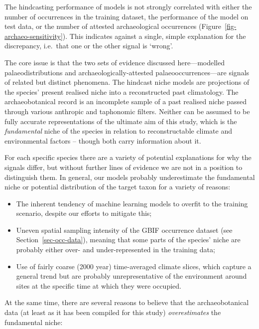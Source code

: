 \documentclass[
  authoryear,
  preprint]{elsarticle}
\providecommand{\tightlist}{%
  \setlength{\itemsep}{0pt}\setlength{\parskip}{0pt}}
\begin{document}
The hindcasting performance of models is not strongly correlated with
either the number of occurrences in the training dataset, the
performance of the model on test data, or the number of attested
archaeological occurrences (Figure~\ref{fig-archaeo-sensitivity}). This
indicates against a single, simple explanation for the discrepancy,
i.e.~that one or the other signal is `wrong'.

The core issue is that the two sets of evidence discussed
here---modelled palaeodistributions and archaeologically-attested
palaeooccurrences---are signals of related but distinct phenomena. The
hindcast niche models are projections of the species' present realised
niche into a reconstructed past climatology. The archaeobotanical record
is an incomplete sample of a past realised niche passed through various
anthropic and taphonomic filters. Neither can be assumed to be fully
accurate representations of the ultimate aim of this study, which is the
\emph{fundamental} niche of the species in relation to reconstructable
climate and environmental factors -- though both carry information about
it.

For each specific species there are a variety of potential explanations
for why the signals differ, but without further lines of evidence we are
not in a position to distinguish them. In general, our models probably
underestimate the fundamental niche or potential distribution of the
target taxon for a variety of reasons:

\begin{itemize}
\tightlist
\item
  The inherent tendency of machine learning models to overfit to the
  training scenario, despite our efforts to mitigate this;
\item
  Uneven spatial sampling intensity of the GBIF occurrence dataset (see
  Section~\ref{sec-occ-data}), meaning that some parts of the species'
  niche are probably either over- and under-represented in the training
  data;
\item
  Use of fairly coarse (2000 year) time-averaged climate slices, which
  capture a general trend but are probably unrepresentative of the
  environment around sites at the specific time at which they were
  occupied.
\end{itemize}

At the same time, there are several reasons to believe that the
archaeobotanical data (at least as it has been compiled for this study)
\emph{overestimates} the fundamental niche:
\end{document}

